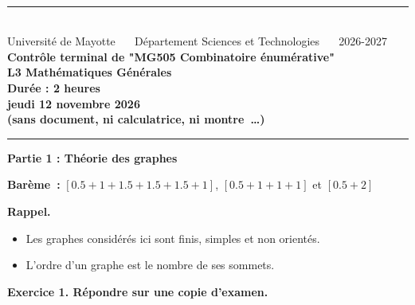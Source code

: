 \documentclass[10pt]{article}
\begin{document}
\begin{center}
$\phantom{}$\vspace{-1.5cm}\\
\rule{\linewidth}{1pt}\\
Universit\'{e} de Mayotte $\phantom{aa}$ D\'{e}partement Sciences et Technologies $\phantom{aa}$ 2026-2027 \\ \vspace{0.3cm}
  \textbf{   Contr\^{o}le terminal de "MG505 Combinatoire énumérative"  \\ L3 Math\'ematiques Générales  \\ Dur\'{e}e : 2 heures \\
   jeudi 12 novembre 2026 \\
(sans document, ni calculatrice, ni montre~\dots)}
\end{center}

\vspace{-0.3cm}
\rule{\linewidth}{1pt}

\textbf{Partie 1 : Théorie des graphes}

\textbf{Barème~:} $[0.5 + 1 + 1.5 + 1.5 + 1.5 + 1]$, $[0.5 + 1 + 1 + 1]$ et $[0.5 + 2]$

\vspace{0.1cm}
\textbf{Rappel.}
\begin{itemize}
  \item Les graphes considérés ici sont finis, simples et non orientés.
  \item L’ordre d’un graphe est le nombre de ses sommets.
\end{itemize}


\noindent \textbf{Exercice 1. Répondre sur une copie d'examen.}
\end{document}
